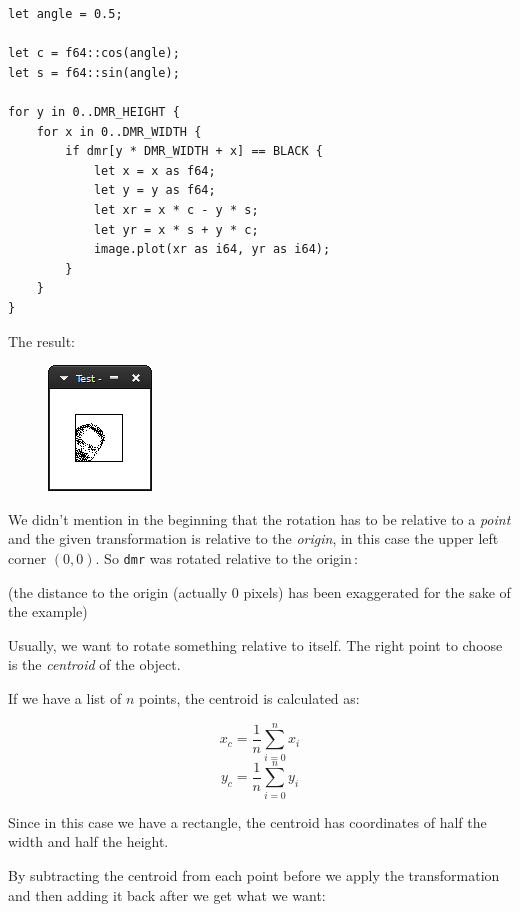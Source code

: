 \documentclass[12pt,openany,a4,usenames,dvipsnames]{book}
\newcommand\pixels{{\pixelfont{}pixels}}
\begin{document}
\begin{verbatim}
let angle = 0.5;

let c = f64::cos(angle);
let s = f64::sin(angle);

for y in 0..DMR_HEIGHT {
    for x in 0..DMR_WIDTH {
        if dmr[y * DMR_WIDTH + x] == BLACK {
            let x = x as f64;
            let y = y as f64;
            let xr = x * c - y * s;
            let yr = x * s + y * c;
            image.plot(xr as i64, yr as i64);
        }
    }
}
\end{verbatim}

The result:

\begin{figure}[H]
\centering
\includegraphics{figures/ch11-2.png}
\end{figure}

We didn't mention in the beginning that the rotation has to be relative to a \emph{point} and the given transformation is relative to the \emph{origin}, in this case the upper left corner $(0,0)$. So \texttt{dmr} was rotated relative to the origin\,:
\begin{figure}[H]
\centering
  \def\svgscale{0.6}

  \def\svgscale{0.6}

\end{figure}

{\centering{}
\noindent(the distance to the origin (actually 0 \pixels{}) has been exaggerated for the sake of the example)
}

Usually, we want to rotate something relative to itself. The right point to choose is the \emph{centroid} of the object.

If we have a list of $n$ points, the centroid is calculated as:

$$ x_c = \frac{1}{n}\sum_{i=0}^{n} x_i $$
$$ y_c = \frac{1}{n}\sum_{i=0}^{n} y_i $$

Since in this case we have a rectangle, the centroid has coordinates of half the width and half the height.

By subtracting the centroid from each point before we apply the transformation and then adding it back after we get what we want:
\end{document}
